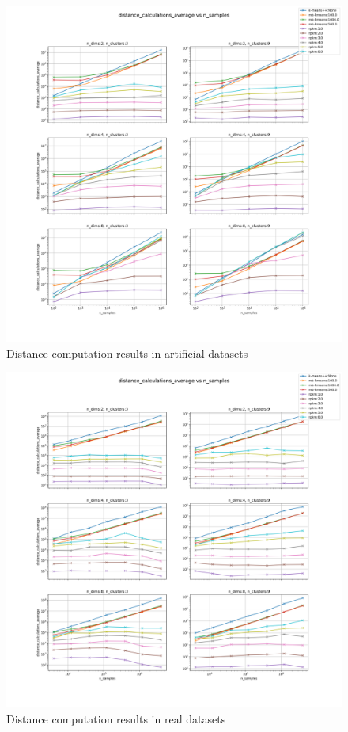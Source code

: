 
\begin{figure}[!ht]
    \includegraphics[width=\linewidth]{images/experiments/distances_artificial.png}
    \caption{Distance computation results in artificial datasets}
    \label{fig:distance_art}
\end{figure}

\begin{figure}[!ht]
    \includegraphics[width=\linewidth]{images/experiments/distances_real.png}
    \caption{Distance computation results in real datasets}
    \label{fig:distance_real}
\end{figure}


